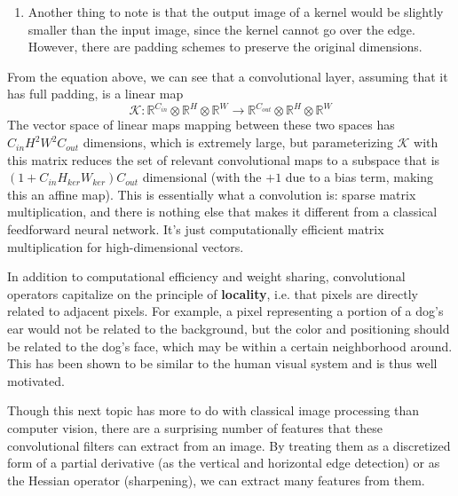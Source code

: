 \begin{definition}
\begin{enumerate}
      \item Another thing to note is that the output image of a kernel would be slightly smaller than the input image, since the kernel cannot go over the edge. However, there are padding schemes to preserve the original dimensions. 
    \end{enumerate}
    From the equation above, we can see that a convolutional layer, assuming that it has full padding, is a linear map  
    \begin{equation}
      \mathcal{K} : \mathbb{R}^{C_{in}} \otimes \mathbb{R}^H \otimes \mathbb{R}^W \rightarrow \mathbb{R}^{C_{out}} \otimes \mathbb{R}^H \otimes \mathbb{R}^W
      \label{eq:conv_mapping}
    \end{equation}
    The vector space of linear maps mapping between these two spaces has $C_{in} H^2 W^2 C_{out}$ dimensions, which is extremely large, but parameterizing $\mathcal{K}$ with this matrix reduces the set of relevant convolutional maps to a subspace that is $(1 + C_{in} H_{ker} W_{ker}) C_{out}$ dimensional (with the $+1$ due to a bias term, making this an affine map). This is essentially what a convolution is: sparse matrix multiplication, and there is nothing else that makes it different from a classical feedforward neural network. It's just computationally efficient matrix multiplication for high-dimensional vectors. 
  \end{definition}

  In addition to computational efficiency and weight sharing, convolutional operators capitalize on the principle of \textbf{locality}, i.e. that pixels are directly related to adjacent pixels. For example, a pixel representing a portion of a dog's ear would not be related to the background, but the color and positioning should be related to the dog's face, which may be within a certain neighborhood around. This has been shown to be similar to the human visual system and is thus well motivated. 

  Though this next topic has more to do with classical image processing than computer vision, there are a surprising number of features that these convolutional filters can extract from an image. By treating them as a discretized form of a partial derivative (as the vertical and horizontal edge detection) or as the Hessian operator (sharpening), we can extract many features from them.  

